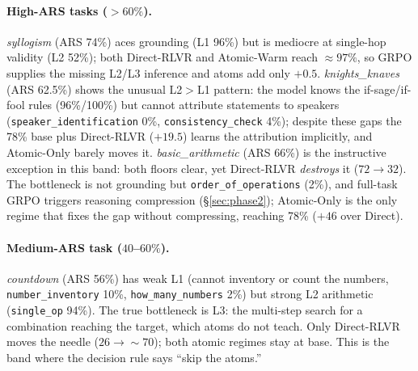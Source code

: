 \documentclass{article}
\begin{document}
\paragraph{High-ARS tasks ($>60\%$).}
\emph{syllogism} (ARS 74\%) aces grounding (L1 96\%) but is mediocre at single-hop validity
(L2 52\%); both Direct-RLVR and Atomic-Warm reach $\approx 97\%$, so GRPO supplies the missing
L2/L3 inference and atoms add only $+0.5$. \emph{knights\_knaves} (ARS 62.5\%) shows the unusual
L2$>$L1 pattern: the model knows the if-sage/if-fool rules (96\%/100\%) but cannot attribute
statements to speakers (\texttt{speaker\_identification} 0\%, \texttt{consistency\_check} 4\%);
despite these gaps the 78\% base plus Direct-RLVR ($+19.5$) learns the attribution implicitly,
and Atomic-Only barely moves it. \emph{basic\_arithmetic} (ARS 66\%) is the instructive
exception in this band: both floors clear, yet Direct-RLVR \emph{destroys} it ($72\to32$). The
bottleneck is not grounding but \texttt{order\_of\_operations} (2\%), and full-task GRPO triggers
reasoning compression (\S\ref{sec:phase2}); Atomic-Only is the only regime that fixes the gap
without compressing, reaching 78\% ($+46$ over Direct).

\paragraph{Medium-ARS task ($40$--$60\%$).}
\emph{countdown} (ARS 56\%) has weak L1 (cannot inventory or count the numbers,
\texttt{number\_inventory} 10\%, \texttt{how\_many\_numbers} 2\%) but strong L2 arithmetic
(\texttt{single\_op} 94\%). The true bottleneck is L3: the multi-step search for a combination
reaching the target, which atoms do not teach. Only Direct-RLVR moves the needle ($26\to\sim70$);
both atomic regimes stay at base. This is the band where the decision rule says ``skip the
atoms.''
\end{document}
